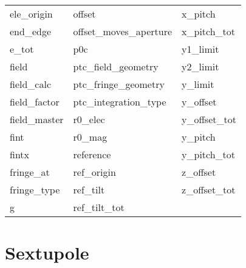 \begin{tabular}{lll}
ele_origin                  & offset                      & x_pitch                     \\
end_edge                    & offset_moves_aperture       & x_pitch_tot                 \\
e_tot                       & p0c                         & y1_limit                    \\
field                       & ptc_field_geometry          & y2_limit                    \\
field_calc                  & ptc_fringe_geometry         & y_limit                     \\
field_factor                & ptc_integration_type        & y_offset                    \\
field_master                & r0_elec                     & y_offset_tot                \\
fint                        & r0_mag                      & y_pitch                     \\
fintx                       & reference                   & y_pitch_tot                 \\
fringe_at                   & ref_origin                  & z_offset                    \\
fringe_type                 & ref_tilt                    & z_offset_tot                \\
g                           & ref_tilt_tot                &                             \\
 \bottomrule
 \end{tabular}
 \vfill
 
 \section{Sextupole}
 \label{s:list.sextupole}
 
